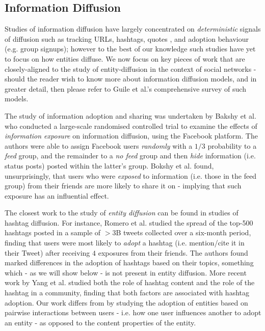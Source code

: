 \documentclass[10pt,journal,compsoc]{IEEEtran}
\begin{document}
\subsection{Information Diffusion}
Studies of information diffusion have largely concentrated on \emph{deterministic} signals of diffusion such as tracking URLs, hashtags, quotes \cite{suen2013nifty}, and adoption behaviour (e.g. group signups); however to the best of our knowledge such studies have yet to focus on how entities diffuse.
We now focus on key pieces of work that are closely-aligned to the study of entity-diffusion in the context of social networks - should the reader wish to know more about information diffusion models, and in greater detail, then please refer to Guile et al.'s \cite{guille2013information} comprehensive survey of such models.

The study of information adoption and sharing was undertaken by Bakshy et al. \cite{bakshy2012role} who conducted a large-scale randomised controlled trial to examine the effects of \emph{information exposure} on information diffusion, using the Facebook platform.
The authors were able to assign Facebook users \emph{randomly} with a $1/3$ probability to a \emph{feed} group, and the remainder to a \emph{no feed} group and then \emph{hide} information (i.e. status posts) posted within the latter's group.
Bokshy et al. found, unsurprisingly, that users who were \emph{exposed} to information (i.e. those in the feed group) from their friends are more likely to share it on - implying that such exposure has an influential effect.

The closest work to the study of \emph{entity diffusion} can be found in studies of hashtag diffusion.
For instance, Romero et al. \cite{romero2011differences} studied the spread of the top-500 hashtags posted in a sample of $>3$B tweets collected over a six-month period, finding that users were most likely to \emph{adopt} a hashtag (i.e. mention/cite it in their Tweet) after receiving $4$ exposures from their friends.
The authors found marked differences in the adoption of hashtags based on their topics, something which - as we will show below - is not present in entity diffusion.
More recent work by Yang et al. \cite{yang2012we} studied both the role of hashtag content and the role of the hashtag in a community, finding that both factors are associated with hashtag adoption.
Our work differs from \cite{yang2012we} by studying the adoption of entities based on pairwise interactions between users - i.e. how one user influences another to adopt an entity - as opposed to the content properties of the entity.
\end{document}
